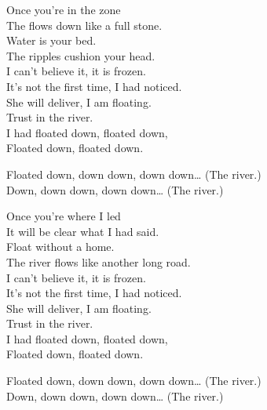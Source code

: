 
\label{album:quarters}





Once you're in the zone \\
The  flows down like a full stone. \\
Water is your bed. \\
The ripples cushion your head. \\

I can't believe it, it is frozen. \\
It's not the first time, I had noticed. \\
She will deliver, I am floating. \\
Trust in the river. \\
I had floated down, floated down, \\
Floated down, floated down. \\


Floated down, down down, down down… (The river.) \\
Down, down down, down down… (The river.) \\


Once you're where I led \\
It will be clear what I had said. \\
Float without a home. \\
The river flows like another long road. \\

I can't believe it, it is frozen. \\
It's not the first time, I had noticed. \\
She will deliver, I am floating. \\
Trust in the river. \\
I had floated down, floated down, \\
Floated down, floated down. \\


Floated down, down down, down down… (The river.) \\
Down, down down, down down… (The river.) \\

